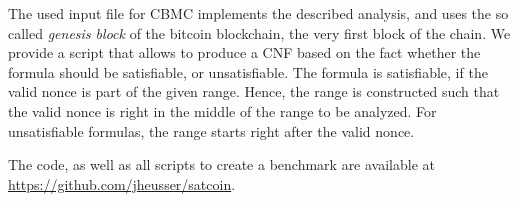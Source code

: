 \documentclass[conference]{IEEEtran}
\begin{document}
The used input file for CBMC implements the described analysis, and uses the so called \emph{genesis block} of the bitcoin blockchain, the very first block of the chain.
We provide a script that allows to produce a CNF based on the fact whether the formula should be satisfiable, or unsatisfiable.
The formula is satisfiable, if the valid nonce is part of the given range.
Hence, the range is constructed such that the valid nonce is right in the middle of the range to be analyzed.
For unsatisfiable formulas, the range starts right after the valid nonce.

The code, as well as all scripts to create a benchmark are available at \url{https://github.com/jheusser/satcoin}.

% 



\end{document}
